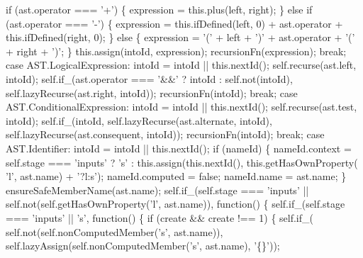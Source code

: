 \begin{DoxyCodeInclude}
{{{      \textcolor{keywordflow}{if} (ast.operator === \textcolor{charliteral}{'+'}) \{
        expression = this.plus(left, right);
      \} \textcolor{keywordflow}{else} \textcolor{keywordflow}{if} (ast.operator === \textcolor{charliteral}{'-'}) \{
        expression = this.ifDefined(left, 0) + ast.operator + this.ifDefined(right, 0);
      \} \textcolor{keywordflow}{else} \{
        expression = \textcolor{charliteral}{'('} + left + \textcolor{charliteral}{')'} + ast.operator + \textcolor{charliteral}{'('} + right + \textcolor{charliteral}{')'};
      \}
      this.assign(intoId, expression);
      recursionFn(expression);
      \textcolor{keywordflow}{break};
    \textcolor{keywordflow}{case} AST.LogicalExpression:
      intoId = intoId || this.nextId();
      \textcolor{keyword}{self}.recurse(ast.left, intoId);
      \textcolor{keyword}{self}.if\_(ast.operator === \textcolor{stringliteral}{'&&'} ? intoId : \textcolor{keyword}{self}.not(intoId), \textcolor{keyword}{self}.lazyRecurse(ast.right, intoId));
      recursionFn(intoId);
      \textcolor{keywordflow}{break};
    \textcolor{keywordflow}{case} AST.ConditionalExpression:
      intoId = intoId || this.nextId();
      \textcolor{keyword}{self}.recurse(ast.test, intoId);
      \textcolor{keyword}{self}.if\_(intoId, \textcolor{keyword}{self}.lazyRecurse(ast.alternate, intoId), \textcolor{keyword}{self}.lazyRecurse(ast.consequent, intoId));
      recursionFn(intoId);
      \textcolor{keywordflow}{break};
    \textcolor{keywordflow}{case} AST.Identifier:
      intoId = intoId || this.nextId();
      \textcolor{keywordflow}{if} (nameId) \{
        nameId.context = \textcolor{keyword}{self}.stage === \textcolor{stringliteral}{'inputs'} ? \textcolor{charliteral}{'s'} : this.assign(this.nextId(), this.getHasOwnProperty(\textcolor{charliteral}{
      'l'}, ast.name) + \textcolor{stringliteral}{'?l:s'});
        nameId.computed = \textcolor{keyword}{false};
        nameId.name = ast.name;
      \}
      ensureSafeMemberName(ast.name);
      \textcolor{keyword}{self}.if\_(\textcolor{keyword}{self}.stage === \textcolor{stringliteral}{'inputs'} || \textcolor{keyword}{self}.not(\textcolor{keyword}{self}.getHasOwnProperty(\textcolor{charliteral}{'l'}, ast.name)),
        \textcolor{keyword}{function}() \{
          self.if\_(self.stage === \textcolor{stringliteral}{'inputs'} || \textcolor{stringliteral}{'s'}, function() \{
            if (create && create !== 1) \{
              self.if\_(
                self.not(self.nonComputedMember(\textcolor{stringliteral}{'s'}, ast.name)),
                self.lazyAssign(self.nonComputedMember(\textcolor{stringliteral}{'s'}, ast.name), \textcolor{stringliteral}{'\{\}'}));
}}}
\end{DoxyCodeInclude}
